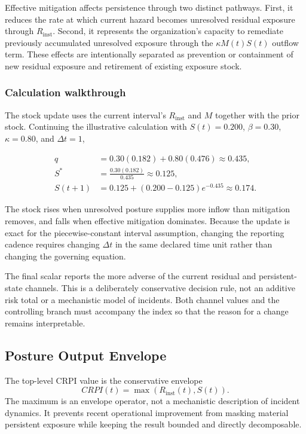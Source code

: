 \documentclass[11pt]{article}
\begin{document}
Effective mitigation affects persistence through two distinct pathways. First, it
reduces the rate at which current hazard becomes unresolved residual exposure through
$R_{\mathrm{inst}}$. Second, it represents the organization's capacity to remediate
previously accumulated unresolved exposure through the $\kappa M(t)S(t)$ outflow term.
These effects are intentionally separated as prevention or containment of new residual
exposure and retirement of existing exposure stock.

\subsubsection{Calculation walkthrough}
The stock update uses the current interval's $R_{\mathrm{inst}}$ and $M$ together with
the prior stock. Continuing the illustrative calculation with $S(t)=0.200$,
$\beta=0.30$, $\kappa=0.80$, and $\Delta t=1$,

\begin{align}
  q&=0.30(0.182)+0.80(0.476)\approx0.435,\\
  S^*&=\frac{0.30(0.182)}{0.435}\approx0.125,\\
  S(t+1)&=0.125+(0.200-0.125)e^{-0.435}\approx0.174.
\end{align}

The stock rises when unresolved posture supplies more inflow than mitigation removes,
and falls when effective mitigation dominates. Because the update is exact for the
piecewise-constant interval assumption, changing the reporting cadence requires changing
$\Delta t$ in the same declared time unit rather than changing the governing equation.


The final scalar reports the more adverse of the current residual
and persistent-state channels. This is a deliberately conservative
decision rule, not an additive risk total or a mechanistic
model of incidents. Both channel values and the controlling branch
must accompany the index so that the reason for a change remains
interpretable.
\subsection{Posture Output Envelope}
The top-level CRPI value is the conservative envelope
\begin{equation}
  CRPI(t)=\max\left(R_{\mathrm{inst}}(t),S(t)\right).
  \label{eq:crpi-envelope}
\end{equation}
The maximum is an envelope operator, not a mechanistic description of incident
dynamics. It prevents recent operational improvement from masking material persistent
exposure while keeping the result bounded
and directly decomposable.
\end{document}
